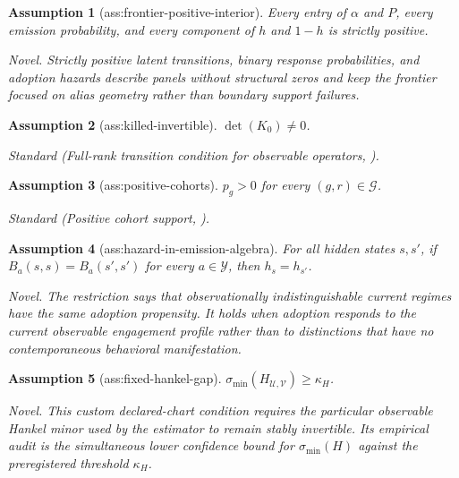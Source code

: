 \documentclass{article}
\newtheorem{assumption}{Assumption}
\begin{document}
\begin{assumption}[ass:frontier-positive-interior]\label{ass:frontier-positive-interior}
Every entry of \(\alpha\) and \(P\), every emission probability, and every component of \(h\) and \(1-h\) is strictly positive.
\par\smallskip\noindent\emph{Novel.} Strictly positive latent transitions, binary response probabilities, and adoption hazards describe panels without structural zeros and keep the frontier focused on alias geometry rather than boundary support failures.
\end{assumption}

\begin{assumption}[ass:killed-invertible]\label{ass:killed-invertible}
\(\det(K_0)\ne0\).
\par\smallskip\noindent\emph{Standard} (Full-rank transition condition for observable operators, \cite{HsuKakadeZhang2012SpectralHMM}).
\end{assumption}

\begin{assumption}[ass:positive-cohorts]\label{ass:positive-cohorts}
\(p_g>0\) for every \((g,r)\in\mathcal G\).
\par\smallskip\noindent\emph{Standard} (Positive cohort support, \cite{CallawaySantAnna2021DiD}).
\end{assumption}

\begin{assumption}[ass:hazard-in-emission-algebra]\label{ass:hazard-in-emission-algebra}
For all hidden states \(s,s'\), if \(B_a(s,s)=B_a(s',s')\) for every \(a\in\mathcal Y\), then \(h_s=h_{s'}\).
\par\smallskip\noindent\emph{Novel.} The restriction says that observationally indistinguishable current regimes have the same adoption propensity. It holds when adoption responds to the current observable engagement profile rather than to distinctions that have no contemporaneous behavioral manifestation.
\end{assumption}

\begin{assumption}[ass:fixed-hankel-gap]\label{ass:fixed-hankel-gap}
\(\sigma_{\min}(H_{\mathcal U,\mathcal V})\ge\kappa_H\).
\par\smallskip\noindent\emph{Novel.} This custom declared-chart condition requires the particular observable Hankel minor used by the estimator to remain stably invertible. Its empirical audit is the simultaneous lower confidence bound for \(\sigma_{\min}(H)\) against the preregistered threshold \(\kappa_H\).
\end{assumption}
\end{document}
